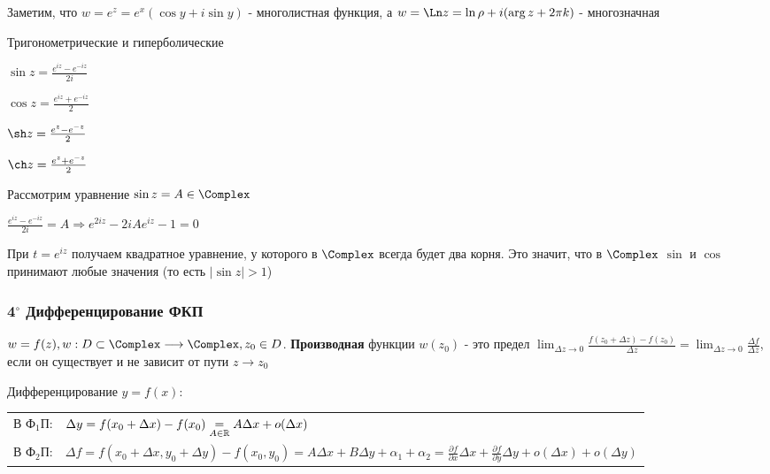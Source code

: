 \documentclass[12pt]{article}
\begin{document}






Заметим, что $w = e^z = e^x (\cos y + i \sin y)$ - многолистная функция, а $w = \Ln z = \ln \rho + i (\arg z + 2\pi k)$ - многозначная

 Тригонометрические и гиперболические

\begin{multicols}{2}
    \begin{center}
        $\sin z = \frac{e^{iz} - e^{-iz}}{2i}$

        $\cos z = \frac{e^{iz} + e^{-iz}}{2}$

        $\sh z = \frac{e^{z} - e^{-z}}{2}$

        $\ch z = \frac{e^{z} + e^{-z}}{2}$
    \end{center}
\end{multicols}

\Nota Рассмотрим уравнение $\sin z = A \in \Complex$

$\frac{e^{iz} - e^{-iz}}{2i} = A \Longrightarrow e^{2iz} - 2iAe^{iz} - 1 = 0$

При $t = e^{iz}$ получаем квадратное уравнение, у которого в $\Complex$ всегда будет два корня. 
Это значит, что в $\Complex$ $\sin$ и $\cos$ принимают любые значения (то есть $|\sin z| > 1$)

\subsubsection{4$^\circ$ Дифференцирование ФКП}

\Def $w = f(z), w : D \subset \Complex \longrightarrow \Complex, z_0 \in D$. \textbf{Производная} функции
$w(z_0)$ - это предел $\lim_{\Delta z \to 0} \frac{f(z_0 + \Delta z) - f(z_0)}{\Delta z} = \lim_{\Delta z \to 0} \frac{\Delta f}{\Delta z}$, 
если он существует и не зависит от пути $z \to z_0$

\Mem Дифференцирование $y = f(x)$:

\begin{tabular}{ll}
    В Ф$_1$П: & $\Delta y = f(x_0 + \Delta x) - f(x_0) \underset{A \in \mathbb{R}}{=} A\Delta x + o(\Delta x)$ \\
    В Ф$_2$П: & $\Delta f = f(x_0 + \Delta x, y_0 + \Delta y) - f(x_0, y_0) = A\Delta x + B \Delta y + \alpha_1 + \alpha_2 = 
    \frac{\partial f}{\partial x} \Delta x + \frac{\partial f}{\partial y} \Delta y + o(\Delta x) + o(\Delta y)$
\end{tabular}
\end{document}
